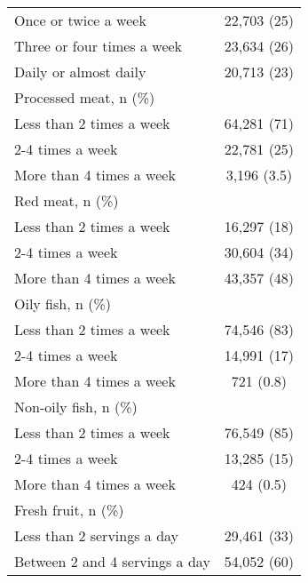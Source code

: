 \begin{tabular}{lc}
\hspace{1em}Once or twice a week & 22,703 (25)\\
\hspace{1em}Three or four times a week & 23,634 (26)\\
\addlinespace
\hspace{1em}Daily or almost daily & 20,713 (23)\\
Processed meat, n (\%) & \\
\hspace{1em}Less than 2 times a week & 64,281 (71)\\
\hspace{1em}2-4 times a week & 22,781 (25)\\
\hspace{1em}More than 4 times a week & 3,196 (3.5)\\
\addlinespace
Red meat, n (\%) & \\
\hspace{1em}Less than 2 times a week & 16,297 (18)\\
\hspace{1em}2-4 times a week & 30,604 (34)\\
\hspace{1em}More than 4 times a week & 43,357 (48)\\
Oily fish, n (\%) & \\
\addlinespace
\hspace{1em}Less than 2 times a week & 74,546 (83)\\
\hspace{1em}2-4 times a week & 14,991 (17)\\
\hspace{1em}More than 4 times a week & 721 (0.8)\\
Non-oily fish, n (\%) & \\
\hspace{1em}Less than 2 times a week & 76,549 (85)\\
\addlinespace
\hspace{1em}2-4 times a week & 13,285 (15)\\
\hspace{1em}More than 4 times a week & 424 (0.5)\\
Fresh fruit, n (\%) & \\
\hspace{1em}Less than 2 servings a day & 29,461 (33)\\
\hspace{1em}Between 2 and 4 servings a day & 54,052 (60)\\

\end{tabular}
